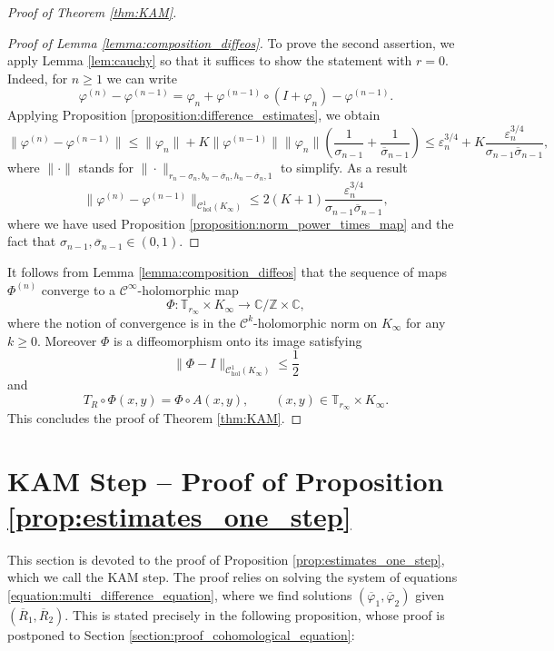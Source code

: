 \documentclass[10pt]{article}
\newcommand{\Z}{\mathbb{Z}}
\newcommand{\C}{\mathbb{C}}
\newcommand{\T}{\mathbb{T}}
\begin{document}
\begin{proof}[Proof of Theorem \ref{thm:KAM}]
\begin{proof}[Proof of Lemma \ref{lemma:composition_diffeos}]
    To prove the second assertion, we apply Lemma \ref{lem:cauchy} so that it suffices to show the statement with $r=0$. Indeed, for $n\geq 1$ we can write
    \[
    \varphi^{(n)}-\varphi^{(n-1)}
    =
    \varphi_{n}
    +
    \varphi^{(n-1)}\circ(I+\varphi_{n})-\varphi^{(n-1)}.
    \]
    Applying Proposition \ref{proposition:difference_estimates}, we obtain
    \[
    \|\varphi^{(n)}-\varphi^{(n-1)}\|
    \leq
    \|\varphi_n\|
    +
    K\|\varphi^{(n-1)}\|\|\varphi_n\|
    \left(\frac{1}{\sigma_{n-1}}+\frac{1}{\overline\sigma_{n-1}}\right)
    \leq 
    \varepsilon_n^{3/4}+K\frac{\varepsilon_n^{3/4}}{\sigma_{n-1}\overline\sigma_{n-1}},
    \]
    where 
    $\|\cdot\|$ stands for $\|\cdot\|_{r_n-\sigma_n, b_n-\overline\sigma_n, h_n-\overline\sigma_n,1}$ to simplify. As a result
    \[
    \|\varphi^{(n)}-\varphi^{(n-1)}\|_{\mathscr C^1_{\text{hol}}(K_\infty)} \leq 2(K+1)\frac{\varepsilon_n^{3/4}}{\sigma_{n-1}\overline\sigma_{n-1}},
    \]
    where we have used Proposition \ref{proposition:norm_power_times_map} and the fact that $\sigma_{n-1},\overline\sigma_{n-1}\in(0,1)$.
\end{proof}

It follows from Lemma \ref{lemma:composition_diffeos} that the sequence of maps $\Phi^{(n)}$ converge to a $\mathscr C^{\infty}$-holomorphic map
\[
\Phi:\T_{r_{\infty}}\times K_\infty\to\C/\Z\times \C,
\]
where the notion of convergence is in the $\mathscr C^k$-holomorphic norm on $K_{\infty}$ for any $k\geq0$. Moreover $\Phi$ is a diffeomorphism onto its image satisfying
\[
\|\Phi-I\|_{\mathscr C^1_{\text{hol}}(K_\infty)}\leq \frac{1}{2}
\]
and
\[
T_R\circ\Phi(x,y)=\Phi\circ A(x,y),
\qquad
(x,y)\in\T_{r_\infty}\times K_\infty.
\]
This concludes the proof of Theorem \ref{thm:KAM}.
\end{proof}


\section{KAM Step -- Proof of Proposition \ref{prop:estimates_one_step}}

This section is devoted to the proof of Proposition \ref{prop:estimates_one_step}, which we call the KAM step. The proof relies on solving the system of equations \eqref{equation:multi_difference_equation}, where we find solutions $(\overline \varphi_1, \overline \varphi_2)$ given $(\overline R_1, \overline R_2)$. This is stated precisely in the following proposition, whose proof is postponed to Section \ref{section:proof_cohomological_equation}:
\end{document}

